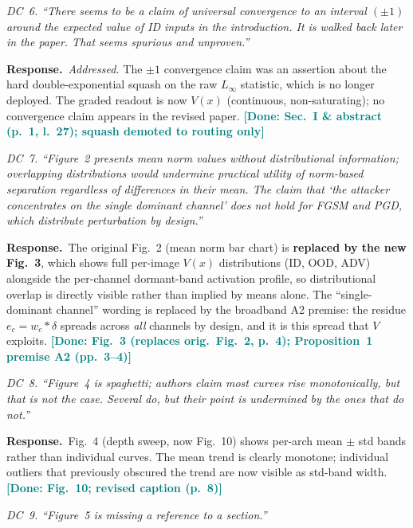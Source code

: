 \documentclass[10pt,letterpaper,journal]{IEEEtran}
\newcommand{\rc}[1]{\smallskip\noindent\textit{\textcolor{black!75}{#1}}\par\smallskip}
\newcommand{\rr}{\noindent\textbf{Response.}~}
\newcommand{\Linf}{$L_\infty$}
\newcommand{\done}[1]{\textcolor{teal}{\textbf{[Done: #1]}}}
\begin{document}
\rc{DC~6. ``There seems to be a claim of universal convergence to an interval
$(\pm 1)$ around the expected value of ID inputs in the introduction. It is walked
back later in the paper. That seems spurious and unproven.''}

\rr \emph{Addressed.} The $\pm1$ convergence claim was an assertion about the hard
double-exponential squash on the raw \Linf{} statistic, which is no longer
deployed. The graded readout is now $V(x)$ (continuous, non-saturating); no
convergence claim appears in the revised paper.
\done{Sec.~I \& abstract (p.~1, l.~27); squash demoted to routing only}

\rc{DC~7. ``Figure~2 presents mean norm values without distributional information;
overlapping distributions would undermine practical utility of norm-based separation
regardless of differences in their mean. The claim that `the attacker concentrates
on the single dominant channel' does not hold for FGSM and PGD, which distribute
perturbation by design.''}

\rr The original Fig.~2 (mean norm bar chart) is \textbf{replaced by the new
Fig.~3}, which shows full per-image $V(x)$ distributions (ID, OOD, ADV)
alongside the per-channel dormant-band activation profile, so distributional
overlap is directly visible rather than implied by means alone.
The ``single-dominant channel'' wording is replaced by the broadband A2 premise:
the residue $e_c=w_c\!\ast\delta$ spreads across \emph{all} channels by design,
and it is this spread that $V$ exploits.
\done{Fig.~3 (replaces orig.\ Fig.~2, p.~4); Proposition~1 premise A2 (pp.~3--4)}

\rc{DC~8. ``Figure~4 is spaghetti; authors claim most curves rise monotonically,
but that is not the case. Several do, but their point is undermined by the ones
that do not.''}

\rr Fig.~4 (depth sweep, now Fig.~10) shows per-arch mean $\pm$ std bands rather
than individual curves. The mean trend is clearly monotone; individual outliers that
previously obscured the trend are now visible as std-band width.
\done{Fig.~10; revised caption (p.~8)}

\rc{DC~9. ``Figure~5 is missing a reference to a section.''}
\end{document}
